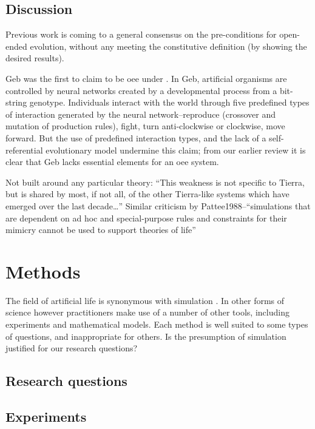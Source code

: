\section{Discussion}
Previous work is coming to a general consensus on the pre-conditions for open-ended evolution, without any meeting the constitutive definition (by showing the desired results).

Geb \parencite{Channon:iw,Channon:2001ly} was the first to claim to be \gls{oee} under \cite{Bedau:2000mi}. In Geb, artificial organisms are controlled by neural networks created by a developmental process from a bit-string genotype. Individuals interact with the world through five predefined types of interaction generated by the neural network--reproduce (crossover and mutation of production rules), fight, turn anti-clockwise or clockwise, move forward. But the use of predefined interaction types, and the lack of a self-referential evolutionary model undermine this claim; from our earlier review it is clear that Geb lacks essential elements for an \gls{oee} system.

Not built around any particular theory:
``This weakness is not specific to Tierra, but is shared by most, if not all, of the other Tierra-like systems which have emerged over the last decade\ldots{}''\parencite{Taylor2001}
Similar criticism by Pattee1988--``simulations that are dependent on ad hoc and special-purpose rules and constraints for their mimicry cannot be used to support theories of life'' \parencite{Taylor2001}

\chapter{Methods}\label{methods}

The field of artificial life is synonymous with simulation \parencite[chap.2]{Aicardi2010}. In other forms of science however practitioners make use of a number of other tools, including experiments and mathematical models. Each method is well suited to some types of questions, and inappropriate for others. Is the presumption of simulation justified for our research questions?

\section{Research questions}\label{research-questions}

\section{Experiments}\label{experiments}

